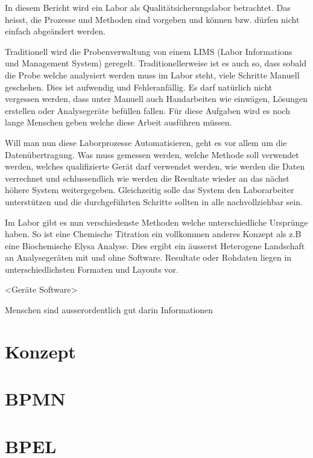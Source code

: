 \documentclass[paper=a4,twoside=false,BCOR=0mm,DIV=calc,fontsize=12pt]{scrartcl}
\begin{document}
In diesem Bericht wird ein Labor als Qualitätsicherungslabor betrachtet. Das heisst, die Prozesse und Methoden sind vorgeben und können bzw. dürfen nicht 
einfach abgeändert werden.

Traditionell wird die Probenverwaltung von einem LIMS (Labor Informations und Management System) geregelt. Traditionellerweise ist es auch so, dass
sobald die Probe welche analysiert werden muss im Labor steht, viele Schritte Manuell geschehen. Dies ist aufwendig und Fehleranfällig. 
Es darf natürlich nicht vergessen werden, dass unter Manuell auch Handarbeiten wie einwägen, Lösungen erstellen oder Analysegeräte befüllen fallen.
Für diese Aufgaben wird es noch lange Menschen geben welche diese Arbeit ausführen müssen.

Will man nun diese Laborprozesse Automatisieren, geht es vor allem um die Datenübertragung. 
Was muss gemessen werden, welche Methode soll verwendet werden,
welches qualifizierte Gerät darf verwendet werden, 
wie werden die Daten verrechnet und schlussendlich wie werden die Resultate wieder an das nächst höhere System weitergegeben.
Gleichzeitig solle das System den Laborarbeiter unterstützen und die durchgeführten Schritte sollten in alle nachvollziehbar sein.

Im Labor gibt es nun verschiedenste Methoden welche unterschiedliche Ursprünge haben. So ist eine Chemische Titration ein vollkommen anderes Konzept 
als z.B eine Biochemische Elysa Analyse.
Dies ergibt ein äusserst Heterogene Landschaft an Analysegeräten mit und ohne Software. Resultate oder Rohdaten liegen in unterschiedlichsten Formaten und Layouts vor.

<Geräte Software>



Menschen sind ausserordentlich gut darin Informationen 







\section{Konzept}


\section{BPMN}


\section{BPEL}
\end{document}
